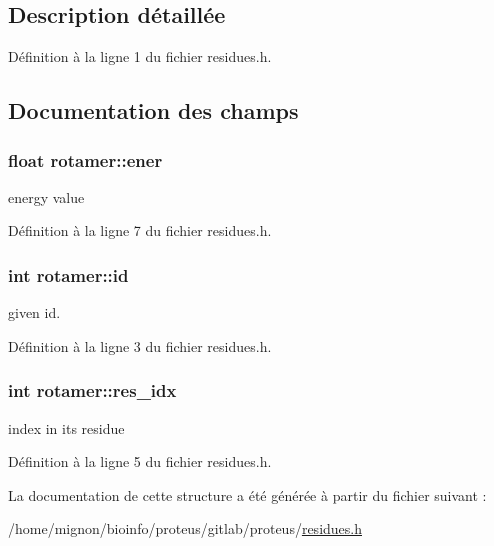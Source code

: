 \subsection{Description détaillée}


Définition à la ligne 1 du fichier residues.\+h.



\subsection{Documentation des champs}
\hypertarget{structrotamer_a41b54eb1e0ae5c1ad17d16a54b3c24b1}{
\subsubsection[{ener}]{\setlength{\rightskip}{0pt plus 5cm}float rotamer\+::ener}}\label{structrotamer_a41b54eb1e0ae5c1ad17d16a54b3c24b1}


energy value 



Définition à la ligne 7 du fichier residues.\+h.

\hypertarget{structrotamer_a553cea6422d2e3e3d37da546979c295d}{
\subsubsection[{id}]{\setlength{\rightskip}{0pt plus 5cm}int rotamer\+::id}}\label{structrotamer_a553cea6422d2e3e3d37da546979c295d}


given id. 



Définition à la ligne 3 du fichier residues.\+h.

\hypertarget{structrotamer_ace4d26cd1c42d492487bff840b3690ad}{
\subsubsection[{res\+\_\+idx}]{\setlength{\rightskip}{0pt plus 5cm}int rotamer\+::res\+\_\+idx}}\label{structrotamer_ace4d26cd1c42d492487bff840b3690ad}


index in its residue 



Définition à la ligne 5 du fichier residues.\+h.



La documentation de cette structure a été générée à partir du fichier suivant \+:\begin{DoxyCompactItemize}
\item 
/home/mignon/bioinfo/proteus/gitlab/proteus/\hyperlink{residues_8h}{residues.\+h}\end{DoxyCompactItemize}
